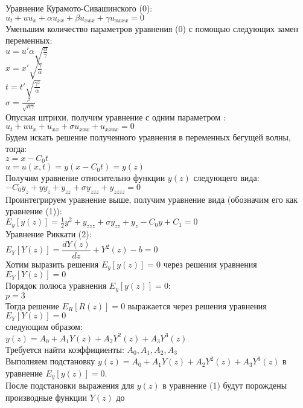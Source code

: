 \documentclass[12pt,a4paper,draft]{letter}
\begin{document}
\onehalfspacing
Уравнение Курамото-Сивашинского (0):
\\
$u_t + u u_x + \alpha u_{xx} + \beta u_{xxx} + \gamma u_{xxxx} = 0$\\
Уменьшим количество параметров уравнения (0) с помощью следующих замен переменных:\\
$u = u' \alpha \sqrt{\frac{\alpha}{\gamma}}$\\
$x = x' \sqrt{\frac{\gamma}{\alpha}}$\\
$t = t' \sqrt{\frac{\gamma^2}{\alpha}}$\\
$\sigma = \frac{\beta}{\sqrt{\alpha \gamma}}$\\
Опуская штрихи, получим уравнение с одним параметром \sigma:\\
$u_t + u u_x + u_{xx} + \sigma u_{xxx} + u_{xxxx} = 0$\\
Будем искать решение полученного уравнения в переменных бегущей волны, тогда:\\
$z = x - C_0 t$\\
$u = u(x, t) = y(x - C_0 t) = y(z)$\\
Получим уравнение относительно функции $y(z)$ следующего вида:\\
$-C_0 y_z + y y_z + y_{zz} + \sigma y_{zzz} + y_{zzzz} = 0$\\
Проинтегрируем уравнение выше, получим уравнение вида (обозначим его как уравнение (1)):\\
$E_y [y(z)] = \frac{1}{2} y^2 + y_{zzz} + \sigma y_{zz} + y_z - C_0 y + C_1 = 0$\\
Уравнение Риккати (2):
\\
$E_Y [Y(z)] = \dfrac{dY(z)}{dz} + Y^2(z) - b = 0$
\\
Хотим выразить решения $E_y [y(z)] = 0$ через решения уравнения $E_Y [Y(z)] = 0$
\\
Порядок полюса уравнения $E_y [y(z)] = 0$:
\\
$p = 3$
\\
Тогда решение $E_R [R(z)] = 0$ выражается через решения уравнения $E_Y [Y(z)] = 0$
\\
следующим образом:
\\
$y(z) = A_0 + A_1 Y(z) + A_2 Y^2(z) + A_3 Y^3(z)$
\\
Требуется найти коэффициенты: $A_0, A_1, A_2, A_3$
\\
Выполняем подстановку $y(z) = A_0 + A_1 Y(z) + A_2 Y^2(z) + A_3 Y^3 (z)$ в уравнение $E_y [y(z)] = 0$.
\\
После подстановки выражения для $y(z)$ в уравнение (1) будут порождены производные функции $Y(z)$ до\\
\end{document}

